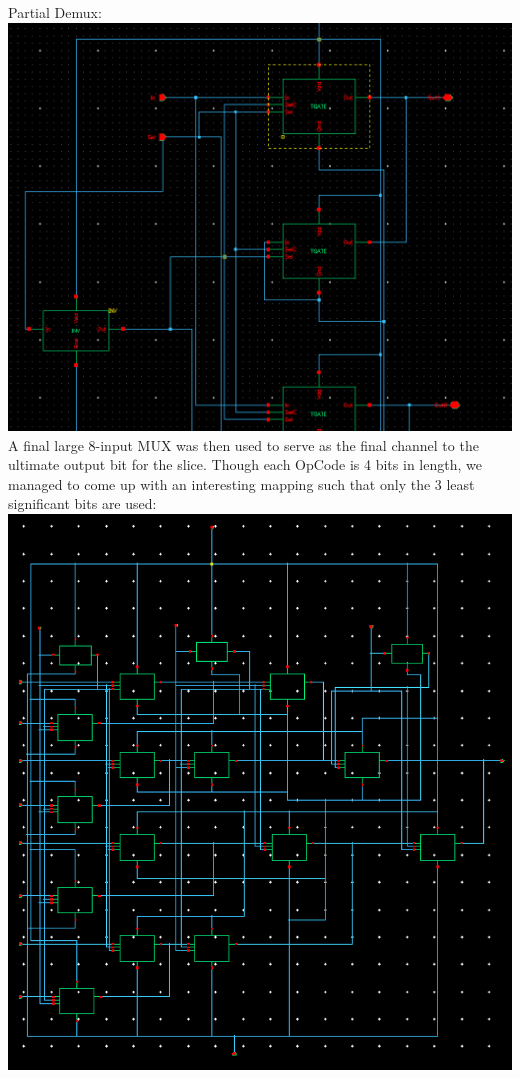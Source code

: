 \documentclass[12pt]{article}
\begin{document}
  Partial Demux:\\
  \includegraphics[scale=0.4]{demuxpart.png}
  \\
	\newline \newline
	A final large 8-input MUX was then used to serve as the final channel to the ultimate output 
	bit for the slice. Though each OpCode is 4 bits in length, we managed to come up with an 
	interesting mapping such that only the 3 least significant bits are used:
	\newline \newline
  \includegraphics[scale=0.4]{8mux.png}
\end{document}
